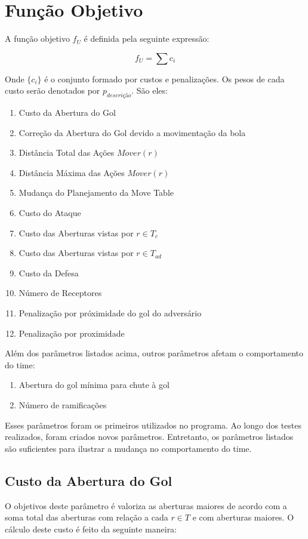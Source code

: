 \section{Função Objetivo}
A função objetivo $f_U$ é definida pela seguinte
expressão:

\begin{dmath}
  f_U = \sum c_i 
\end{dmath}

Onde $\lbrace c_i \rbrace$ é o conjunto formado
por custos e penalizações. Os pesos de cada custo
serão denotados por $p_{descrição}$. São eles:
\begin{enumerate}
  \item Custo da Abertura do Gol
  \item Correção da Abertura do Gol devido a movimentação da bola
  \item Distância Total das Ações $Mover(r)$
  \item Distância Máxima das Ações $Mover(r)$
  \item Mudança do Planejamento da Move Table
  \item Custo do Ataque
  \item Custo das Aberturas vistas por $r \in T_c$
  \item Custo das Aberturas vistas por $r \in T_{ad}$
  \item Custo da Defesa
  \item Número de Receptores
  \item Penalização por próximidade do gol do adversário
  \item Penalização por proximidade
\end{enumerate}

Além dos parâmetros listados acima, outros parâmetros
afetam o comportamento do time:
\begin{enumerate}
  \item Abertura do gol mínima para chute à gol
  \item Número de ramificações
\end{enumerate}

Esses parâmetros foram os primeiros utilizados no programa.
Ao longo dos testes realizados, foram criados novos parâmetros.
Entretanto, os parâmetros listados são suficientes para ilustrar
a mudança no comportamento do time.

\subsection{Custo da Abertura do Gol}\label{subsec:custo_gap}
O objetivos deste parâmetro é valoriza as aberturas maiores
de acordo com a soma total das aberturas com relação a cada
$r \in T$ e com aberturas maiores.
O cálculo deste custo é feito da seguinte maneira:

